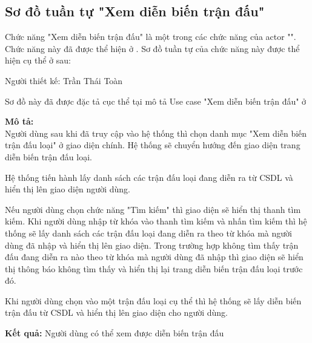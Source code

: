 \subsection{Sơ đồ tuần tự "Xem diễn biến trận đấu"}
\setcounter{figure}{0}

Chức năng "Xem diễn biến trận đấu" là một trong các chức năng của actor "".
Chức năng này đã được thể hiện ở \myref{}.
Sơ đồ tuần tự của chức năng này được thể hiện cụ thể ở \myref{} sau:

Người thiết kế: Trần Thái Toàn

Sơ đồ này đã được đặc tả cục thể tại mô tả Use case
"Xem diễn biến trận đấu" ở 

\noindent
\textbf{Mô tả:}\\
Người dùng sau khi đã truy cập vào hệ thống thì chọn danh mục "Xem diễn biến trận đấu loại" ở giao diện chính. Hệ thống sẽ chuyển hướng đến giao diện trang diễn biến trận đấu loại. \par
Hệ thống tiến hành lấy danh sách các trận đấu loại đang diễn ra từ CSDL và hiển thị lên giao diện người dùng. \par
Nếu người dùng chọn chức năng "Tìm kiếm" thì giao diện sẽ hiển thị thanh tìm kiếm. Khi người dùng nhập từ khóa vào thanh tìm kiếm và nhấn tìm kiếm thì hệ thống sẽ lấy danh sách các trận đấu loại đang diễn ra theo từ khóa mà người dùng đã nhập và hiển thị lên giao diện. Trong trường hợp không tìm thấy trận đấu đang diễn ra nào theo từ khóa mà người dùng đã nhập thì giao diện sẽ hiển thị thông báo không tìm thấy và hiển thị lại trang diễn biến trận đấu loại trước đó. \par
Khi người dùng chọn vào một trận đấu loại cụ thể thì hệ thống sẽ lấy diễn biến trận đấu từ CSDL và hiển thị lên giao diện cho người dùng.

\noindent
\textbf{Kết quả:} Người dùng có thể xem được diễn biến trận đấu



